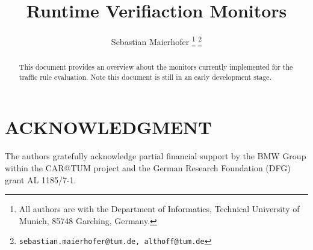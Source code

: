 


\title{\LARGE \bf
Runtime Verifiaction Monitors
}

\author{Sebastian Maierhofer %
	\thanks{All authors are with the Department of Informatics, Technical University of Munich, 85748 Garching, Germany.}%
	\thanks{{\tt\small sebastian.maierhofer@tum.de, althoff@tum.de}}%
}





\maketitle
\thispagestyle{empty}
\pagestyle{empty}


\begin{abstract}

This document provides an overview about the monitors currently implemented for the traffic rule evaluation.
Note this document is still in an early development stage.

\end{abstract}















\section*{ACKNOWLEDGMENT}

The authors gratefully acknowledge partial financial support by the BMW Group within the CAR@TUM project and the German Research Foundation (DFG) grant AL 1185/7-1.



\balance

%
%



